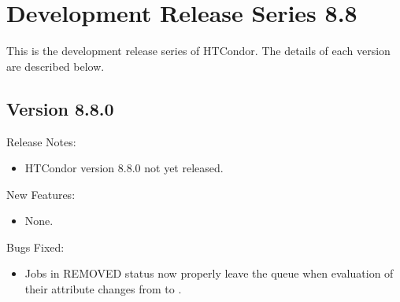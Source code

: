 
\section{Development Release Series 8.8}\label{sec:History-8-8}

This is the development release series of HTCondor.
The details of each version are described below.

\subsection*{\label{sec:New-8-8-0}Version 8.8.0}

\noindent Release Notes:

\begin{itemize}

\item HTCondor version 8.8.0 not yet released.

\end{itemize}


\noindent New Features:

\begin{itemize}

\item None.

\end{itemize}

\noindent Bugs Fixed:

\begin{itemize}

\item Jobs in REMOVED status now properly leave the queue when
evaluation of their  attribute changes from
 to .

\end{itemize}

